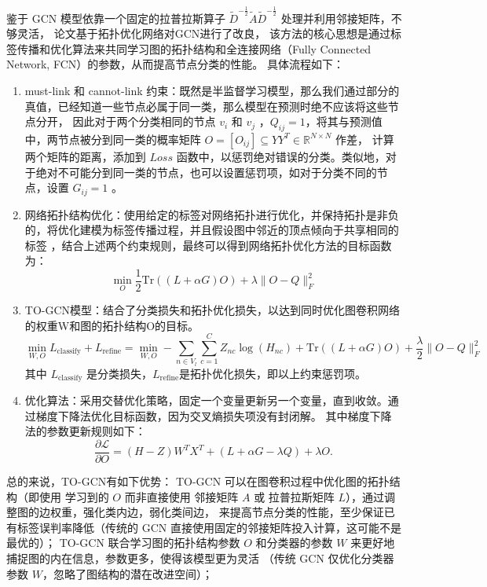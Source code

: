 \documentclass[12pt]{ctexart} %
\begin{document}
鉴于 GCN 模型依靠一个固定的拉普拉斯算子 $\tilde{D}^{-\frac{1}{2}}\tilde{A}\tilde{D}^{-\frac{1}{2}}$ 
处理并利用邻接矩阵，不够灵活，
论文\cite{yang_2019_topology}基于拓扑优化网络对GCN进行了改良，
该方法的核心思想是通过标签传播和优化算法来共同学习图的拓扑结构和全连接网络（Fully Connected Network, FCN）的参数，从而提高节点分类的性能。
具体流程如下：
\begin{enumerate}
    \item must-link 和 cannot-link 约束：既然是半监督学习模型，那么我们通过部分的真值，已经知道一些节点必属于同一类，那么模型在预测时绝不应该将这些节点分开，
        因此对于两个分类相同的节点 $v_i$ 和 $v_j$ ，$Q_{ij} = 1$，将其与预测值中，两节点被分到同一类的概率矩阵 $O = [O_{i j}]\subseteq Y Y^{T}\in \mathbb{R}^{N \times N} $ 作差，
        计算两个矩阵的距离，添加到 $Loss$ 函数中，以惩罚绝对错误的分类。类似地，对于绝对不可能分到同一类的节点，也可以设置惩罚项，如对于分类不同的节点，设置 $G_{ij} = 1$ 。
    \item 网络拓扑结构优化：使用给定的标签对网络拓扑进行优化，并保持拓扑是非负的，将优化建模为标签传播过程，并且假设图中邻近的顶点倾向于共享相同的标签
        ，结合上述两个约束规则，最终可以得到网络拓扑优化方法的目标函数为：
        \begin{equation}
            \min_O \frac{1}{2} \text{Tr}((L + \alpha G) O) + \lambda \|O - Q\|_F^2
        \end{equation}
    \item TO-GCN模型：结合了分类损失和拓扑优化损失，以达到同时优化图卷积网络的权重W和图的拓扑结构O的目标。
        \begin{equation}
            \min_{W, O} L_{\text{classify}} + L_{\text{refine}} = \min_{W, O} - \sum_{n \in V_l} \sum_{c=1}^C Z_{nc} \log(H_{nc}) + \text{Tr}((L + \alpha G) O) + \frac{\lambda}{2} \|O - Q\|_F^2
        \end{equation}
        其中 $L_{\text{classify}}$ 是分类损失，$L_{\text{refine}}$是拓扑优化损失，即以上约束惩罚项。
    \item 优化算法：采用交替优化策略，固定一个变量更新另一个变量，直到收敛。通过梯度下降法优化目标函数，因为交叉熵损失项没有封闭解。
        其中梯度下降法的参数更新规则如下：
        \begin{equation}
            \frac{\partial \mathcal{L}}{\partial O} = (H - Z)W^T X^T + (L + \alpha G - \lambda Q) + \lambda O.
        \end{equation}
\end{enumerate}

总的来说，TO-GCN有如下优势：
TO-GCN 可以在图卷积过程中优化图的拓扑结构（即使用 学习到的 $O$ 而非直接使用 邻接矩阵 $A$ 或 拉普拉斯矩阵 $L$），通过调整图的边权重，强化类内边，弱化类间边，
来提高节点分类的性能，至少保证已有标签误判率降低（传统的 GCN 直接使用固定的邻接矩阵投入计算，这可能不是最优的）；
TO-GCN 联合学习图的拓扑结构参数 $O$ 和分类器的参数 $W$ 来更好地捕捉图的内在信息，参数更多，使得该模型更为灵活
（传统 GCN 仅优化分类器参数 $W$，忽略了图结构的潜在改进空间）；
\end{document}
